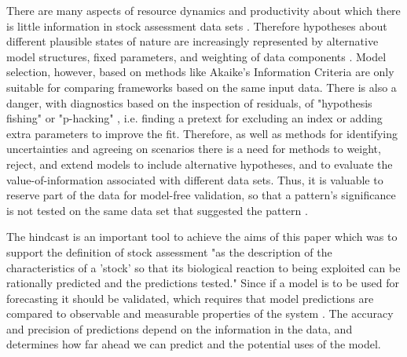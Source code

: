 \documentclass[12pt,halfline,a4paper,nonumbib]{ouparticle}
\newcommand{\todo}{\textcolor{red}}
\begin{document}
There are many aspects of resource dynamics and productivity about which there is little information in stock assessment data sets \parencite[e.g.][]{lee2011m,lee2012steepness, jiao2012modelling,simon2012effects,mangel2013perspective,pepin2015reconsidering,cury2014resolving}. Therefore hypotheses about different plausible states of nature are increasingly represented by alternative model structures, fixed parameters, and weighting of data components \parencite[][]{sharma2020trfmo}. Model selection, however, based on methods like Akaike’s Information Criteria  \parencite[AIC,][]{akaike1998information} are only suitable for comparing frameworks based on the same input data. There is also a danger, with diagnostics based on the inspection of residuals, of "hypothesis fishing" or "p-hacking" \parencite{wasserstein2016asa,head2015extent}, i.e. finding a pretext for excluding an index or adding extra parameters %
to improve the fit. %
Therefore, as well as methods for identifying uncertainties and agreeing on scenarios \parencite{leach2014elicit} there is a need for methods to weight, reject, and extend models to include alternative hypotheses, and to evaluate the value-of-information associated with different data sets.
Thus, it is valuable to reserve part of the data for model-free validation, so that a pattern’s significance is not tested on the same data set that suggested the pattern \parencite{arlot2010survey}. %


The hindcast is an important tool to achieve the aims of this paper which was to support the definition of stock assessment "as the description of the characteristics of a ’stock’ so that its biological reaction to being exploited can be rationally predicted and the predictions tested." Since if a model is to be used for forecasting it should be validated, which requires that model predictions are compared to observable and measurable properties of the system \parencite{ianelli2016multi}. The accuracy and precision of predictions depend on the information in the data, and determines how far ahead we can predict and the potential uses of the model. 
\end{document}
